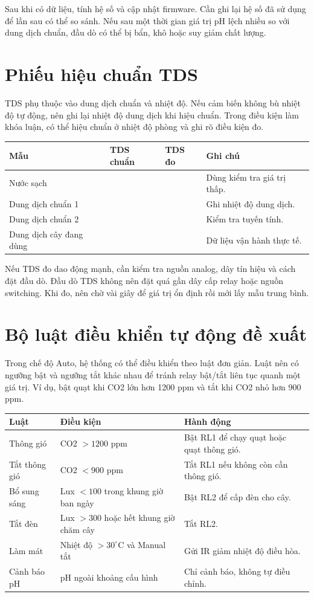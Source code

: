 Sau khi có dữ liệu, tính hệ số và cập nhật firmware. Cần ghi lại hệ số đã sử dụng để lần sau có thể so sánh. Nếu sau một thời gian giá trị pH lệch nhiều so với dung dịch chuẩn, đầu dò có thể bị bẩn, khô hoặc suy giảm chất lượng.

\section{Phiếu hiệu chuẩn TDS}
TDS phụ thuộc vào dung dịch chuẩn và nhiệt độ. Nếu cảm biến không bù nhiệt độ tự động, nên ghi lại nhiệt độ dung dịch khi hiệu chuẩn. Trong điều kiện làm khóa luận, có thể hiệu chuẩn ở nhiệt độ phòng và ghi rõ điều kiện đo.

\begin{longtable}{|p{3cm}|p{3cm}|p{3cm}|p{4.2cm}|}
\hline
\textbf{Mẫu} & \textbf{TDS chuẩn} & \textbf{TDS đo} & \textbf{Ghi chú} \\
\hline
Nước sạch &  &  & Dùng kiểm tra giá trị thấp. \\
\hline
Dung dịch chuẩn 1 &  &  & Ghi nhiệt độ dung dịch. \\
\hline
Dung dịch chuẩn 2 &  &  & Kiểm tra tuyến tính. \\
\hline
Dung dịch cây đang dùng &  &  & Dữ liệu vận hành thực tế. \\
\hline
\end{longtable}

Nếu TDS đo dao động mạnh, cần kiểm tra nguồn analog, dây tín hiệu và cách đặt đầu dò. Đầu dò TDS không nên đặt quá gần dây cấp relay hoặc nguồn switching. Khi đo, nên chờ vài giây để giá trị ổn định rồi mới lấy mẫu trung bình.

\section{Bộ luật điều khiển tự động đề xuất}
Trong chế độ Auto, hệ thống có thể điều khiển theo luật đơn giản. Luật nên có ngưỡng bật và ngưỡng tắt khác nhau để tránh relay bật/tắt liên tục quanh một giá trị. Ví dụ, bật quạt khi CO2 lớn hơn 1200 ppm và tắt khi CO2 nhỏ hơn 900 ppm.

\begin{longtable}{|p{3.2cm}|p{4.2cm}|p{5.8cm}|}
\hline
\textbf{Luật} & \textbf{Điều kiện} & \textbf{Hành động} \\
\hline
Thông gió & CO2 $>1200$ ppm & Bật RL1 để chạy quạt hoặc quạt thông gió. \\
\hline
Tắt thông gió & CO2 $<900$ ppm & Tắt RL1 nếu không còn cần thông gió. \\
\hline
Bổ sung sáng & Lux $<100$ trong khung giờ ban ngày & Bật RL2 để cấp đèn cho cây. \\
\hline
Tắt đèn & Lux $>300$ hoặc hết khung giờ chăm cây & Tắt RL2. \\
\hline
Làm mát & Nhiệt độ $>30^\circ$C và Manual tắt & Gửi IR giảm nhiệt độ điều hòa. \\
\hline
Cảnh báo pH & pH ngoài khoảng cấu hình & Chỉ cảnh báo, không tự điều chỉnh. \\
\hline
\end{longtable}

